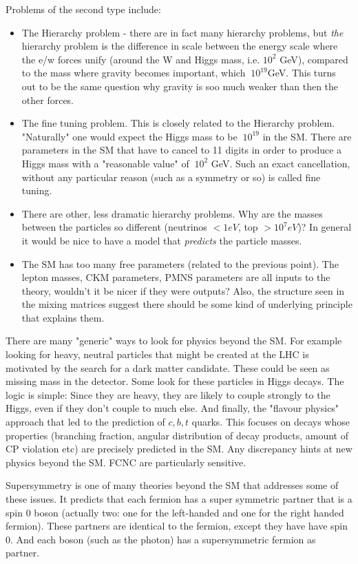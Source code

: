 Problems of the second type include:
\begin{itemize}
\item The Hierarchy problem - there are in fact many hierarchy problems, but \emph{the} hierarchy problem is the difference in scale between the energy scale where the e/w forces unify (around the W and Higgs mass, i.e. $10^2$ GeV), compared to the mass where gravity becomes important, which $~10^{19}$GeV. This turns out to be the same question why gravity is soo much weaker than then the other forces.
\item The fine tuning problem. This is closely related to the Hierarchy problem. "Naturally" one would expect the Higgs mass to be $~10^{19}$ in the SM. There are parameters in the SM that have to cancel to 11 digits in order to produce a Higgs mass with a "reasonable value" of $~10^2$ GeV. Such an exact cancellation, without any particular reason (such as a symmetry or so) is called fine tuning.
\item There are other, less dramatic hierarchy problems. Why are the masses between the particles so different (neutrinos $<1eV$, top $>10^7 eV$)? In general it would be nice to have a model that \emph{predicts} the particle masses.
\item The SM has too many free parameters (related to the previous point). The lepton masses, CKM parameters, PMNS parameters are all inputs to the theory, wouldn't it be nicer if they were outputs? Also, the structure seen in the mixing matrices suggest there should be some kind of underlying principle that explains them.
\end{itemize}

There are many "generic" ways to look for physics beyond the SM. For example looking for heavy, neutral particles that might be created at the LHC is motivated by the search for a dark matter candidate. These could be seen as missing mass in the detector. Some look for these particles in Higgs decays. The logic is simple: Since they are heavy, they are likely to couple strongly to the Higgs, even if they don't couple to much else. And finally, the "flavour physics" approach that led to the prediction of $c, b, t$ quarks. This focuses on decays whose properties (branching fraction, angular distribution of decay products, amount of CP violation etc) are precisely predicted in the SM. Any discrepancy hints at new physics beyond the SM. FCNC are particularly sensitive.


Supersymmetry is one of many theories beyond the SM that addresses some of these issues. It predicts that each fermion has a super symmetric partner that is a spin 0 boson (actually two: one for the left-handed and one for the right handed fermion). These partners are identical to the fermion, except they have have spin 0. And each boson (such as the photon) has a supersymmetric fermion as partner.

